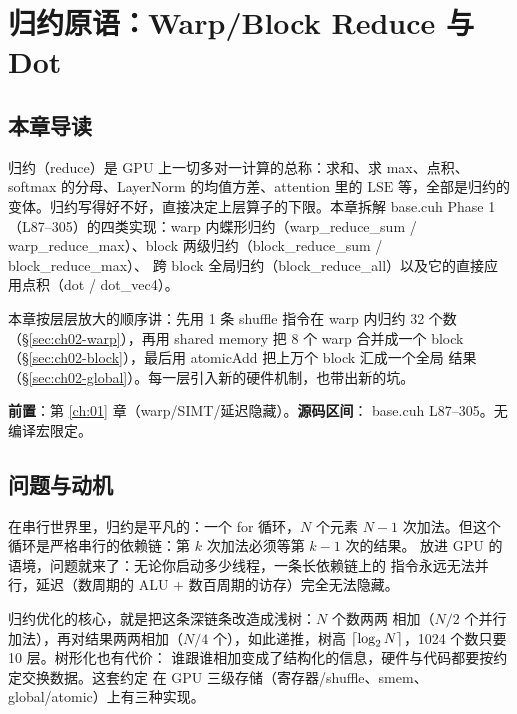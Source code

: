 \chapter{归约原语：Warp/Block Reduce 与 Dot}\label{ch:02}

\section{本章导读}

归约（reduce）是 GPU 上一切多对一计算的总称：求和、求 max、点积、softmax
的分母、LayerNorm 的均值方差、attention 里的 $\mathrm{LSE}$ 等，全部是归约的
变体。归约写得好不好，直接决定上层算子的下限。本章拆解
base.cuh Phase 1（L87--305）的四类实现：warp 内蝶形归约（warp\_reduce\_sum /
warp\_reduce\_max）、block 两级归约（block\_reduce\_sum / block\_reduce\_max）、
跨 block 全局归约（block\_reduce\_all）以及它的直接应用点积（dot /
dot\_vec4）。

本章按层层放大的顺序讲：先用 1 条 shuffle 指令在 warp 内归约 32 个数
（\S\ref{sec:ch02-warp}），再用 shared memory 把 8 个 warp 合并成一个 block
（\S\ref{sec:ch02-block}），最后用 atomicAdd 把上万个 block 汇成一个全局
结果（\S\ref{sec:ch02-global}）。每一层引入新的硬件机制，也带出新的坑。

\textbf{前置}：第 \ref{ch:01} 章（warp/SIMT/延迟隐藏）。\textbf{源码区间}：
base.cuh L87--305。无编译宏限定。

\section{问题与动机}

在串行世界里，归约是平凡的：一个 for 循环，$N$ 个元素 $N-1$ 次加法。但这个
循环是严格串行的依赖链：第 $k$ 次加法必须等第 $k-1$ 次的结果。
放进 GPU 的语境，问题就来了：无论你启动多少线程，一条长依赖链上的
指令永远无法并行，延迟（数周期的 ALU + 数百周期的访存）完全无法隐藏。

归约优化的核心，就是把这条深链条改造成浅树：$N$ 个数两两
相加（$N/2$ 个并行加法），再对结果两两相加（$N/4$ 个），如此递推，树高
$\lceil \log\sb 2 N \rceil$，1024 个数只要 10 层。树形化也有代价：
谁跟谁相加变成了结构化的信息，硬件与代码都要按约定交换数据。这套约定
在 GPU 三级存储（寄存器/shuffle、smem、global/atomic）上有三种实现。

